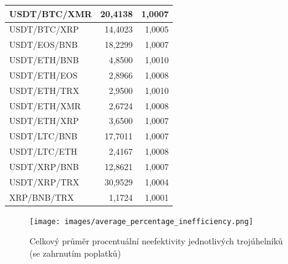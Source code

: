 \documentclass[thesis=B,czech]{FITthesis}[2019/03/21]
\begin{document}
\begin{table}
\begin{tabular}{|| l | r | r ||}
 \hline USDT/BTC/XMR & 20,4138 & 1,0007\\ 
 \hline USDT/BTC/XRP & 14,4023 & 1,0005\\ 
 \hline USDT/EOS/BNB & 18,2299 & 1,0007\\ 
 \hline USDT/ETH/BNB & 4,8500 & 1,0010\\ 
 \hline USDT/ETH/EOS & 2,8966 & 1,0008\\ 
 \hline USDT/ETH/TRX & 2,9500 & 1,0010\\ 
 \hline USDT/ETH/XMR & 2,6724 & 1,0008\\ 
 \hline USDT/ETH/XRP & 3,6500 & 1,0007\\ 
 \hline USDT/LTC/BNB & 17,7011 & 1,0007\\ 
 \hline USDT/LTC/ETH & 2,4167 & 1,0008\\ 
 \hline USDT/XRP/BNB & 12,8621 & 1,0007\\ 
 \hline USDT/XRP/TRX & 30,9529 & 1,0004\\ 
 \hline XRP/BNB/TRX & 1,1724 & 1,0001\\ 
 \hline
\end{tabular}
\end{table}

\begin{figure}\centering
	\texttt{[image: images/average\_percentage\_inefficiency.png]}
	\caption{Celkový průměr procentuální neefektivity jednotlivých trojúhelníků (se zahrnutím poplatků)}\label{average_percentage_inefficiency}
\end{figure}
\end{document}
